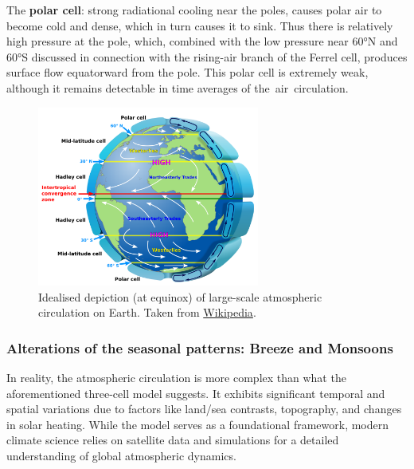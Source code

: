 The \textbf{polar cell}: strong radiational cooling near the poles, causes polar air to become cold and dense, which in turn causes it to sink. Thus there is relatively high pressure at the pole, which, combined with the low pressure near \ang{60}N and \ang{60}S discussed in connection with the rising-air branch of the Ferrel cell, produces surface flow equatorward from the pole. This polar cell is extremely weak, although it remains detectable in time averages of the air circulation.

\begin{figure}
	\centering
	\includegraphics[width=0.65\textwidth]{figs/atm-general-circulation}
	\caption{Idealised depiction (at equinox) of large-scale atmospheric circulation on Earth. Taken from \href{https://commons.wikimedia.org/wiki/File:Earth_Global_Circulation_-_en.svg}{Wikipedia}.}
	\label{fig:atm-general-circulation}
\end{figure}

\subsubsection{Alterations of the seasonal patterns: Breeze and Monsoons}\label{subsubsec:monsoons}

In reality, the atmospheric circulation is more complex than what the aforementioned three-cell model suggests.
It exhibits significant temporal and spatial variations due to factors like land/sea contrasts,
topography, and changes in solar heating. While the model serves as a foundational framework,
modern climate science relies on satellite data and simulations for a detailed understanding of
global atmospheric dynamics.

